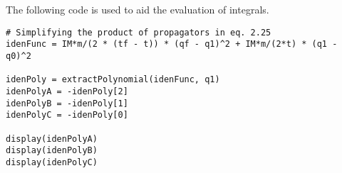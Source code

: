 The following code is used to aid the evaluation of integrals.
\begin{verbatim}
# Simplifying the product of propagators in eq. 2.25
idenFunc = IM*m/(2 * (tf - t)) * (qf - q1)^2 + IM*m/(2*t) * (q1 - q0)^2

idenPoly = extractPolynomial(idenFunc, q1)
idenPolyA = -idenPoly[2]
idenPolyB = -idenPoly[1]
idenPolyC = -idenPoly[0]

display(idenPolyA)
display(idenPolyB)
display(idenPolyC)
    
\end{verbatim}